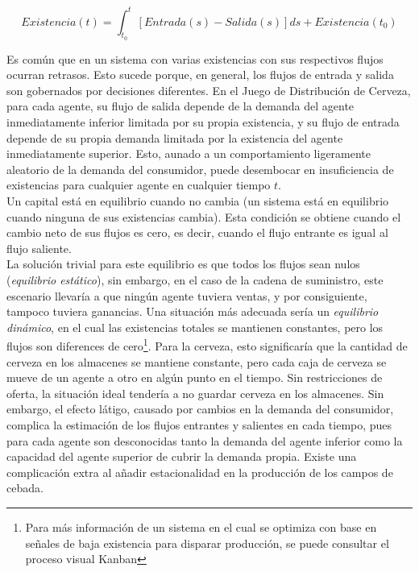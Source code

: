 $$
Existencia(t) = \int_{t_{0}}^t [Entrada(s) - Salida(s)]ds + Existencia(t_{0}) 
$$

Es com\'un que en un sistema con varias existencias con sus respectivos flujos ocurran retrasos. Esto sucede porque, en general, los flujos de entrada y salida son gobernados por decisiones diferentes. En el Juego de Distribuci\'on de Cerveza, para cada agente, su flujo de salida depende de la demanda del agente inmediatamente inferior limitada por su propia existencia, y su flujo de entrada depende de su propia demanda limitada por la existencia del agente inmediatamente superior. Esto, aunado a un comportamiento ligeramente aleatorio de la demanda del consumidor, puede desembocar en insuficiencia de existencias para cualquier agente en cualquier tiempo $t$. \\

Un capital est\'a en equilibrio cuando no cambia (un sistema est\'a en equilibrio cuando ninguna de sus existencias cambia). Esta condici\'on se obtiene cuando el cambio neto de sus flujos es cero, es decir, cuando el flujo entrante es igual al flujo saliente. \\

La soluci\'on trivial para este equilibrio es que todos los flujos sean nulos (\textit{equilibrio est\'atico}), sin embargo, en el caso de la cadena de suministro, este escenario llevar\'ia a que ning\'un agente tuviera ventas, y por consiguiente, tampoco tuviera ganancias. Una situaci\'on m\'as adecuada ser\'ia un \textit{equilibrio din\'amico}, en el cual las existencias totales se mantienen constantes, pero los flujos son diferences de cero\footnote{Para m\'as informaci\'on de un sistema en el cual se optimiza con base en se\~nales de baja existencia para disparar producci\'on, se puede consultar el proceso visual Kanban\cite{Majowska}}. Para la cerveza, esto significar\'ia que la cantidad de cerveza en los almacenes se mantiene constante, pero cada caja de cerveza se mueve de un agente a otro en alg\'un punto en el tiempo. Sin restricciones de oferta, la situaci\'on ideal tender\'ia a no guardar cerveza en los almacenes. Sin embargo, el efecto l\'atigo, causado por cambios en la demanda del consumidor, complica la estimaci\'on de los flujos entrantes y salientes en cada tiempo, pues para cada agente son desconocidas tanto la demanda del agente inferior como la capacidad del agente superior de cubrir la demanda propia. Existe una complicaci\'on extra al a\~nadir estacionalidad en la producci\'on de los campos de cebada. \\

